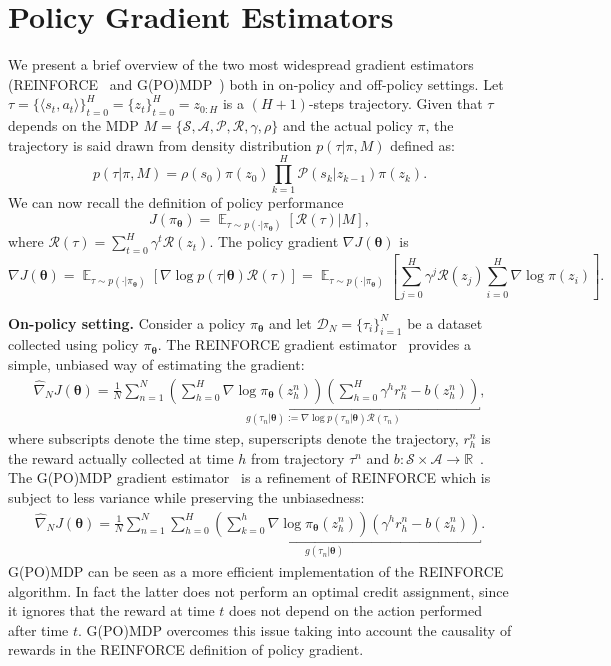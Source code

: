 \documentclass{article}
\makeatletter
\theoremstyle{remark}
\theoremstyle{definition}
\DeclareRobustCommand{\eg}{e.g.,\@\xspace}
\newcommand{\realspace}{\mathbb R}      %
\DeclareMathOperator*{\EV}{\mathbb{E}}
\newcommand{\EVV}[2][\ppvect \in \ppspace]{\EV_{#1}\left[{#2}\right]}
\newcommand{\vtheta}{\boldsymbol{\theta}}
\newcommand{\Reward}{\mathcal{R}}
\newcommand{\pol}{\pi_{\vtheta}}
\newcommand{\gradJ}[1]{\nabla J(#1)}
\newcommand{\gradApp}[2]{\widehat{\nabla}_{#2}J(#1)}
\makeatother
\begin{document}
\section{Policy Gradient Estimators} \label{A:gradient_estimators}
We present a brief overview of the two most widespread gradient estimators (REINFORCE~\citep{williams1992simple} and G(PO)MDP~\citep{baxter2001infinite}) both in on-policy and off-policy settings.
Let $\tau = \{\langle s_t,a_t \rangle\}_{t=0}^{H}= \{z_t\}_{t=0}^{H} = z_{0:H}$ is a $(H+1)$-steps trajectory.
Given that $\tau$ depends on the MDP $M=\{\mathcal{S},\mathcal{A}, \mathcal{P}, \Reward, \gamma, \rho\}$ and the actual policy $\pi$, the trajectory is
said drawn from density distribution $p(\tau|\pi,M)$ defined as:
\[
        p(\tau|\pi,M) = \rho(s_0) \pi(z_0) \prod_{k=1}^{H} \mathcal{P}(s_k|z_{k-1})\pi(z_k).
\]
We can now recall the definition of policy performance 
\[
        J(\pol) = \EVV[\tau \sim p(\cdot|\pol)]{\Reward(\tau)|M},
\]
where $\Reward(\tau) = \sum_{t=0}^{H}\gamma^t \Reward(z_t)$.
The policy gradient $\nabla J(\vtheta)$ is
\begin{equation}\label{E:onpolicygradient}
        \gradJ{\vtheta} = \EVV[\tau \sim p(\cdot|\pol)]{\nabla \log p(\tau|\vtheta)\Reward(\tau)} = \EVV[\tau \sim p(\cdot|\pol)]{\sum_{j=0}^{H} \gamma^j \mathcal{R}(z_j) \sum_{i=0}^{H} \nabla \log\pi(z_i)}.
\end{equation}

\textbf{On-policy setting.}
Consider a policy $\pol$ and let $\mathcal{D}_N = \{\tau_i\}_{i=1}^N$ be a dataset collected using policy $\pol$.
The REINFORCE gradient estimator~\citep{williams1992simple} provides a simple, unbiased way of estimating the gradient:
\begin{align*}
\gradApp{\vtheta}{N} = \frac{1}{N}\sum_{n=1}^{N}
\underbracket{
        \left(\sum_{h=0}^{H}\nabla \log \pol(z_h^n) \right)\left(\sum_{h=0}^{H}\gamma^h 
        r_h^n
- b(z_h^n)\right)
}_{g(\tau_n|\vtheta):=\nabla \log p(\tau_n|\vtheta)\Reward(\tau_n)}
,
\end{align*}
where subscripts denote the time step, superscripts denote the trajectory, $r_h^n$ is the reward actually collected at time $h$ from trajectory $\tau^n$ and $b : \mathcal{S}\times\mathcal{A} \to \realspace$~\citep[\eg][]{Thomas2017actionbaseline}.
The G(PO)MDP gradient estimator~\cite{baxter2001infinite} is a refinement of REINFORCE which is subject to less variance \cite{zhao2011analysis} while preserving the unbiasedness:
\begin{align*}
\gradApp{\vtheta}{N} = \frac{1}{N}\sum_{n=1}^{N}
\underbracket{
        \sum_{h=0}^{H}\left(\sum_{k=0}^{h} \nabla \log \pol (z_h^n) \right)\left(\gamma^h 
        r_h^n
        - b(z^n_h)\right)
}_{g(\tau_n|\vtheta)}.
\end{align*}
G(PO)MDP can be seen as a more efficient implementation of the REINFORCE algorithm. 
In fact the latter does not perform an optimal credit assignment, since it ignores that the reward at time $t$ does not depend on the action performed after time $t$.
G(PO)MDP overcomes this issue taking into account the causality of rewards in the REINFORCE definition of policy gradient.
\end{document}
